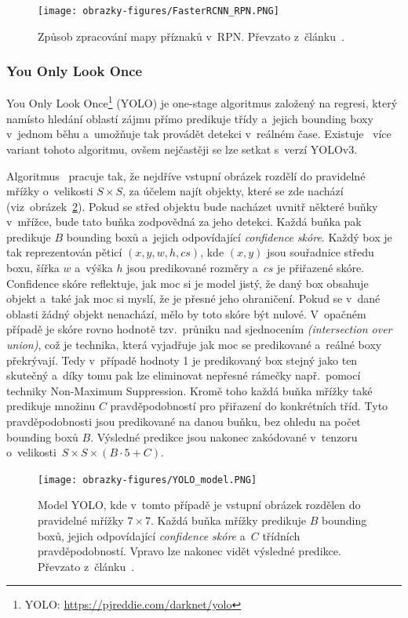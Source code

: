 \begin{figure}[H]
	\centering
	\setlength{\fboxsep}{0pt}
	\texttt{[image: obrazky-figures/FasterRCNN\_RPN.PNG]}
	\caption{Způsob zpracování mapy příznaků v~RPN. Převzato z~článku~\cite{article:FasterRCNN}.}
	\label{img:RPN}
\end{figure}

\subsubsection{You Only Look Once}
\label{sec:YOLO}
You Only Look Once\footnote{YOLO: \url{https://pjreddie.com/darknet/yolo}} (YOLO) je one-stage algoritmus založený na regresi, který namísto hledání oblastí zájmu přímo predikuje třídy a~jejich bounding boxy v~jednom běhu a~umožňuje tak provádět detekci v~reálném čase. Existuje~\cite{website:IntroToYOLO} více variant tohoto algoritmu, ovšem nejčastěji se lze setkat s~verzí YOLOv3.

Algoritmus~\cite{website:IntroToYOLO, article:YOLO} pracuje tak, že nejdříve vstupní obrázek rozdělí do pravidelné mřížky o~velikosti $S \times S$, za účelem najít objekty, které se zde nachází (viz~obrázek~\ref{img:YOLO}). Pokud se střed objektu bude nacházet uvnitř některé buňky v~mřížce, bude tato buňka zodpovědná za jeho detekci. Každá buňka pak predikuje $B$ bounding boxů a~jejich odpovídající \emph{confidence skóre}. Každý box je tak reprezentován pěticí $(x, y, w, h, cs)$, kde $(x, y)$ jsou souřadnice středu boxu, šířka $w$ a~výška $h$ jsou predikované rozměry a~$cs$ je přiřazené skóre. Confidence skóre reflektuje, jak moc si je model jistý, že daný box obsahuje objekt a~také jak moc si myslí, že je přesné jeho ohraničení. Pokud se v~dané oblasti žádný objekt nenachází, mělo by toto skóre být nulové. V~opačném případě je skóre rovno hodnotě tzv.~průniku nad sjednocením \emph{(intersection over union)}, což je technika, která vyjadřuje jak moc se predikované a~reálné boxy překrývají. Tedy v~případě hodnoty 1 je predikovaný box stejný jako ten skutečný a~díky tomu pak lze eliminovat nepřesné rámečky např.~pomocí techniky Non-Maximum Suppression. Kromě toho každá buňka mřížky také predikuje množinu $C$ pravděpodobností pro přiřazení do konkrétních tříd. Tyto pravděpodobnosti jsou predikované na danou buňku, bez ohledu na počet bounding boxů $B$. Výsledné predikce jsou nakonec zakódované v~tenzoru o~velikosti~$S \times S \times (B \cdot 5 + C)$.

\begin{figure}[hbt]
	\centering
	\setlength{\fboxsep}{0pt}
	\texttt{[image: obrazky-figures/YOLO\_model.PNG]}
	\caption{Model YOLO, kde v~tomto případě je vstupní obrázek rozdělen do pravidelné mřížky $7 \times 7$. Každá buňka mřížky predikuje $B$ bounding boxů, jejich odpovídající \emph{confidence skóre} a~$C$ třídních pravděpodobností. Vpravo lze nakonec vidět výsledné predikce. Převzato z~článku~\cite{article:YOLO}.}
	\label{img:YOLO}
\end{figure}


